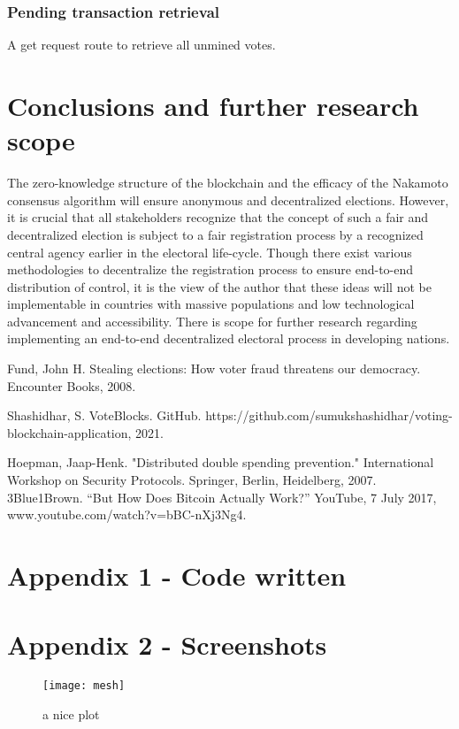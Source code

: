 \documentclass{article}
\begin{document}
    \subsubsection{Pending transaction retrieval}
    A get request route to retrieve all unmined votes.

    \section{Conclusions and further research scope}
    The zero-knowledge structure of the blockchain and the efficacy of the Nakamoto consensus algorithm will ensure anonymous and decentralized elections. However, it is crucial that all stakeholders recognize that the concept of such a fair and decentralized election is subject to a fair registration process by a recognized central agency earlier in the electoral life-cycle. Though there exist various methodologies to decentralize the registration process to ensure end-to-end distribution of control, it is the view of the author that these ideas will not be implementable in countries with massive populations and low technological advancement and accessibility. There is scope for further research regarding implementing an end-to-end decentralized electoral process in developing nations.

    \begin{thebibliography}{9}
        Fund, John H. Stealing elections: How voter fraud threatens our democracy. Encounter Books, 2008.
        
        Shashidhar, S. VoteBlocks. GitHub. https://github.com/sumukshashidhar/voting-blockchain-application, 2021.
        
        Hoepman, Jaap-Henk. "Distributed double spending prevention." International Workshop on Security Protocols. Springer, Berlin, Heidelberg, 2007.
        3Blue1Brown. “But How Does Bitcoin Actually Work?” YouTube, 7 July 2017, www.youtube.com/watch?v=bBC-nXj3Ng4.
    \end{thebibliography}
    \appendix
    \appendixpage
    \addappheadtotoc
    \section*{Appendix 1 - Code written}
    \section*{Appendix 2 - Screenshots}

    \begin{figure}[h]
        \centering
        \texttt{[image: mesh]}
        \caption{a nice plot}
        \label{fig:mesh1}
    \end{figure}
    
\end{document}
